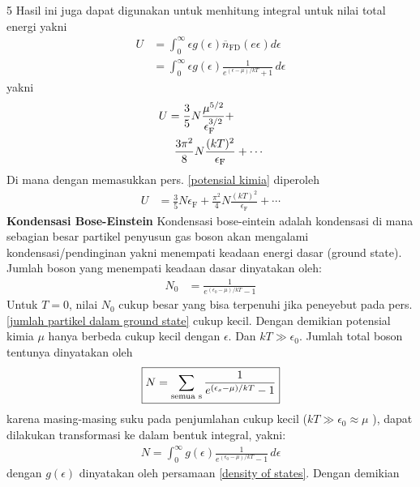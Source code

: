 \documentclass[a4paper  , 6 pt]{article}
\begin{document}
\begin{tiny}
\begin{multicols} {5}
 Hasil ini juga dapat digunakan untuk menhitung integral untuk nilai total energi yakni
 \begin{align}
 U &= \int_{0}^{\infty} \epsilon g(\epsilon) \overline{n}_\mathrm{FD} (e\epsilon) d \epsilon \nonumber \\
 & = \int_{0}^{\infty} \epsilon g(\epsilon) \frac{1}{e^{(\epsilon - \mu)/kT}+1}  \, d\epsilon 
 \end{align}
yakni 
\begin{align}
U& =\frac{3}{5} N \frac{\mu^{5/2}}{\epsilon_\mathrm{F}^{3/2}} + \nonumber \\
& \hspace{0.2 cm} \frac{3\pi^2 }{8} N \frac{(kT)^2}{\epsilon_\mathrm{F}} + \cdots
\end{align}
Di mana dengan memasukkan pers. \ref{potensial kimia} diperoleh
\begin{align}
U&  = \frac{3}{5} N \epsilon_\mathrm{F} + \frac{\pi^2}{4} N \frac{(kT)^2}{\epsilon_\mathrm{F}} + \cdots
\end{align}
\textbf{Kondensasi Bose-Einstein} \newline
Kondensasi bose-eintein adalah kondensasi di mana sebagian besar partikel penyusun gas boson akan mengalami kondensasi/pendinginan yakni menempati keadaan energi dasar (ground state). \newline
Jumlah boson yang menempati keadaan dasar dinyatakan oleh:
\begin{align}
N_0 & = \frac{1}{e^{(\epsilon_0 - \mu )/kT} - 1} \label{jumlah partikel dalam ground state}
\end{align}
Untuk $T =0$, nilai $N_0$ cukup besar yang bisa terpenuhi jika peneyebut  pada pers. \ref{jumlah partikel dalam ground state} cukup kecil. Dengan demikian potensial kimia $\mu$ hanya berbeda cukup kecil dengan $\epsilon$.  Dan $kT \gg \epsilon_0$. Jumlah total boson tentunya dinyatakan oleh
\begin{align}
\boxed{N = \sum_{\mathrm{semua \hspace{0.1 cm} s}} \frac{1}{e^{(\epsilon_s - \mu)/ kT} - 1} }
\end{align}
karena masing-masing suku pada penjumlahan cukup kecil ($kT \gg \epsilon_0 \approx \mu$ ), dapat dilakukan transformasi ke dalam bentuk integral, yakni:
\begin{align}
N = \int_{0}^{\infty} g(\epsilon ) \frac{1}{e^{(\epsilon_0 - \mu)/kT} -1 } \, d\epsilon
\end{align}
dengan $g(\epsilon)$ dinyatakan oleh persamaan \ref{density of states}. Dengan demikian 

\end{multicols}
\end{tiny}
\end{document}
